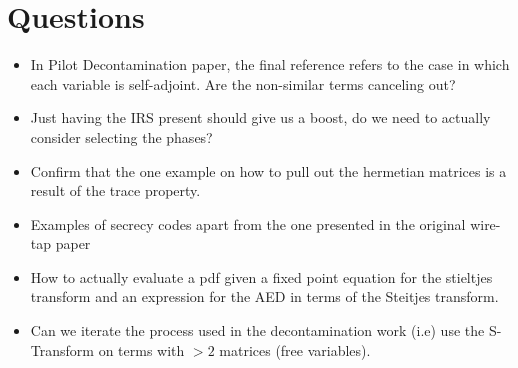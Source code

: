 \documentclass[12pt,a4paper]{report}
\begin{document}
\section{Questions}
\begin{itemize}
\item
	In Pilot Decontamination paper, the final reference refers to the case in which each variable is self-adjoint.
	Are the non-similar terms canceling out?
\item 
	Just having the IRS present should give us a boost, do we need to actually consider selecting the phases?
	
\item 
	Confirm that the one example on how to pull out the hermetian matrices is a result of the trace property.
	
\item 
	Examples of secrecy codes apart from the one presented in the original wire-tap paper
	
\item 
	How to actually evaluate a pdf given a fixed point equation for the stieltjes transform and an expression for the
	AED in terms of the Steitjes transform. 
	
\item 
	Can we iterate the process used in the decontamination work (i.e) use the S-Transform on terms with $>2$
	 matrices (free variables).
\end{itemize}


\end{document}
